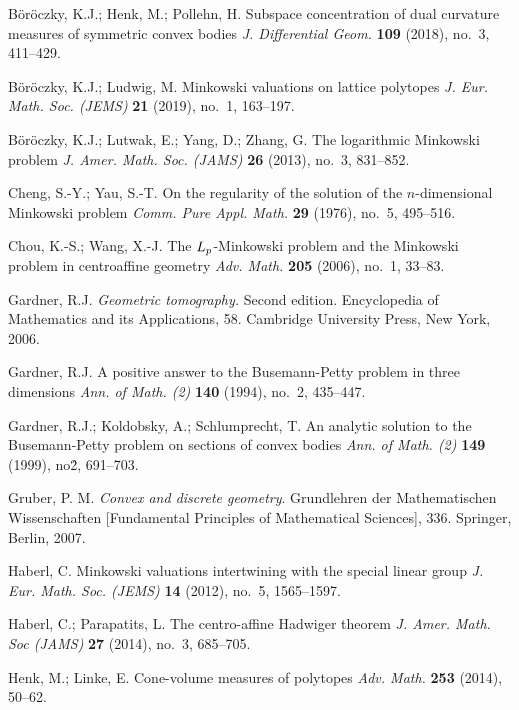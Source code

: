 \documentclass{cpamart1}     %
\theoremstyle{definition}
\theoremstyle{remark}
\begin{document}
\begin{thebibliography}{99}
B\"or\"oczky, K.J.; Henk, M.; Pollehn, H.
Subspace concentration of dual curvature measures of symmetric convex bodies
\textit{J. Differential Geom.}
\textbf{109} (2018), no.\ 3, 411--429.


B\"or\"oczky, K.J.; Ludwig, M.
Minkowski valuations on lattice polytopes
\textit{J. Eur. Math. Soc. (JEMS)}
\textbf{21} (2019), no.\ 1, 163--197.


B\"or\"oczky, K.J.; Lutwak, E.; Yang, D.; Zhang, G.
The logarithmic Minkowski problem
\textit{J. Amer. Math. Soc. (JAMS)}
\textbf{26} (2013), no.\ 3, 831--852.






Cheng, S.-Y.; Yau, S.-T.
On the regularity of the solution of the $n$-dimensional
Minkowski problem
\textit{Comm. Pure Appl. Math.}
\textbf{29} (1976), no.\ 5, 495--516.


Chou, K.-S.; Wang, X.-J.
The {$L\sb p$}-Minkowski problem and the Minkowski problem
in centroaffine geometry
\textit{Adv. Math.}
\textbf{205} (2006), no.\ 1, 33--83.


Gardner, R.J. 
\textit{Geometric tomography.} Second edition. Encyclopedia of Mathematics and its Applications, 58. 
Cambridge University Press, New York, 2006. 


Gardner, R.J. 
A positive answer to the Busemann-Petty problem in three dimensions
\textit{Ann. of Math. (2)}
\textbf{140} (1994), no.\ 2, 435--447.


Gardner, R.J.; Koldobsky, A.; Schlumprecht, T.
An analytic solution to the Busemann-Petty problem on sections of convex bodies
\textit{Ann. of Math. (2)}
\textbf{149} (1999), no\. 2, 691--703.



Gruber, P. M. 
\textit{Convex and discrete geometry}.
Grundlehren der Mathematischen Wissenschaften [Fundamental Principles of Mathematical Sciences], 336. 
Springer, Berlin, 2007.


Haberl, C.
Minkowski valuations intertwining with the special linear group
\textit{J. Eur. Math. Soc. (JEMS)}
\textbf{14} (2012), no.\ 5, 1565--1597.

Haberl, C.; Parapatits, L.
The centro-affine Hadwiger theorem 
\textit{J. Amer. Math. Soc (JAMS)} 
\textbf{27} (2014), no.\  3, 685--705.

Henk, M.; Linke, E.
Cone-volume measures of polytopes
\textit{Adv. Math.} 
\textbf{253} (2014), 50--62.


\end{thebibliography}
\end{document}
